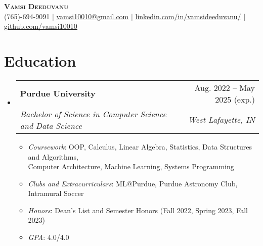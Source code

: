 \documentclass[letterpaper,11pt]{article}
\makeatletter
\newcommand{\resumeItem}[1]{
  \item\small{
    {#1 \vspace{-2pt}}
  }
}
\newcommand{\resumeSubheading}[4]{
  \vspace{-2pt}\item
    \begin{tabular*}{0.97\textwidth}[t]{l@{\extracolsep{\fill}}r}
      \textbf{\small#1} & \small#2 \\
      \textit{\small#3} & \textit{\small #4} \\
    \end{tabular*}\vspace{-7pt}
}
\newcommand{\resumeSubHeadingListStart}{\begin{itemize}[leftmargin=0.15in, label={}]}
\newcommand{\resumeSubHeadingListEnd}{\end{itemize}}
\newcommand{\resumeItemListStart}{\begin{itemize}}
\newcommand{\resumeItemListEnd}{\end{itemize}\vspace{-5pt}}
\makeatother
\begin{document}

\begin{center}
    \textbf{\Huge \scshape Vamsi Deeduvanu} \\ \vspace{1pt}
    \small (765)-694-9091 $|$ \href{mailto:vamsi10010@gmail.com}{\underline{vamsi10010@gmail.com}} $|$ 
    \href{https://www.linkedin.com/in/vamsideeduvanu}{\underline{linkedin.com/in/vamsideeduvanu/}} $|$
    \href{https://github.com/vamsi10010}{\underline{github.com/vamsi10010}}
\end{center}



\section{Education}
  \resumeSubHeadingListStart
    \resumeSubheading
      {Purdue University}{Aug. 2022 -- May 2025 (exp.)}
      {Bachelor of Science in Computer Science and Data Science}{West Lafayette, IN}
      \resumeItemListStart
        \resumeItem{\textit{Coursework}: OOP, Calculus, Linear Algebra, Statistics, Data Structures and Algorithms, \\Computer Architecture,
        Machine Learning, Systems Programming
        }
        \resumeItem{\textit{Clubs and Extracurriculars}: ML@Purdue, Purdue Astronomy Club, Intramural Soccer}
        \resumeItem{\textit{Honors}: Dean's List and Semester Honors (Fall 2022, Spring 2023, Fall 2023)}
        \resumeItem{\textit{GPA}: 4.0/4.0}
      \resumeItemListEnd
  \resumeSubHeadingListEnd
\end{document}
